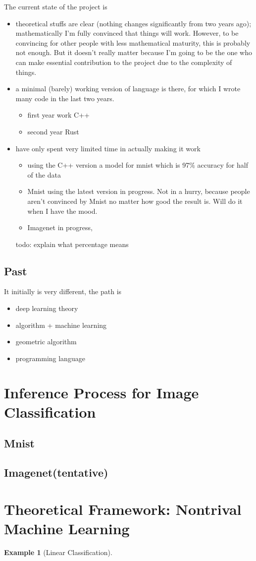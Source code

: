 \documentclass[11pt, oneside]{article}   	%
\theoremstyle{definition}
\newtheorem*{eg}{Example}
\begin{document}
The current state of the project is
\begin{itemize}
	\item theoretical stuffs are clear (nothing changes significantly from two years ago); mathematically I'm fully convinced that things will work. However, to be convincing for other people with less mathematical maturity, this is probably not enough. But it doesn't really matter because I'm going to be the one who can make essential contribution to the project due to the complexity of things.
	\item a minimal (barely) working version of language is there, for which I wrote many code in the last two years.
	\begin{itemize}
		\item first year work C++
		\item second year Rust
	\end{itemize}
	\item have only spent very limited time in actually making it work
	\begin{itemize}
		\item using the C++ version a model for mnist which is 97\% accuracy for half of the data 
		\item Mnist using the latest version in progress. Not in a hurry, because people aren't convinced by Mnist no matter how good the result is. Will do it when I have the mood.
		\item Imagenet in progress, 
	\end{itemize}
\begin{rmk}
	todo: explain what percentage means
\end{rmk}
\end{itemize}

\subsection{Past}

It initially is very different, the path is
\begin{itemize}
	\item deep learning theory
	\item algorithm + machine learning
	\item geometric algorithm
	\item programming language
\end{itemize}

\section{Inference Process for Image Classification}
\subsection{Mnist}
\subsection{Imagenet(tentative)}

\section{Theoretical Framework: Nontrival Machine Learning}

\begin{eg}
	[Linear Classification]
\end{eg}
\end{document}
